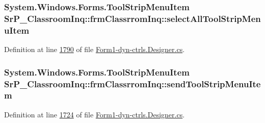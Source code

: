 \hypertarget{class_sr_p___classroom_inq_1_1frm_classrrom_inq_a7e6e1b306acf890605ad11f6aca7fce7}{
\subsubsection[{select\-All\-Tool\-Strip\-Menu\-Item}]{\setlength{\rightskip}{0pt plus 5cm}\-System.\-Windows.\-Forms.\-Tool\-Strip\-Menu\-Item {\bf \-Sr\-P\-\_\-\-Classroom\-Inq\-::frm\-Classrrom\-Inq\-::select\-All\-Tool\-Strip\-Menu\-Item}}}
\label{class_sr_p___classroom_inq_1_1frm_classrrom_inq_a7e6e1b306acf890605ad11f6aca7fce7}


\-Definition at line \hyperlink{_form1-dyn-ctrls_8_designer_8cs_source_l01790}{1790} of file \hyperlink{_form1-dyn-ctrls_8_designer_8cs_source}{\-Form1-\/dyn-\/ctrls.\-Designer.\-cs}.

\hypertarget{class_sr_p___classroom_inq_1_1frm_classrrom_inq_ab491a97cbd395fd4e69e4312fdc48eeb}{
\subsubsection[{send\-Tool\-Strip\-Menu\-Item}]{\setlength{\rightskip}{0pt plus 5cm}\-System.\-Windows.\-Forms.\-Tool\-Strip\-Menu\-Item {\bf \-Sr\-P\-\_\-\-Classroom\-Inq\-::frm\-Classrrom\-Inq\-::send\-Tool\-Strip\-Menu\-Item}}}
\label{class_sr_p___classroom_inq_1_1frm_classrrom_inq_ab491a97cbd395fd4e69e4312fdc48eeb}


\-Definition at line \hyperlink{_form1-dyn-ctrls_8_designer_8cs_source_l01724}{1724} of file \hyperlink{_form1-dyn-ctrls_8_designer_8cs_source}{\-Form1-\/dyn-\/ctrls.\-Designer.\-cs}.


